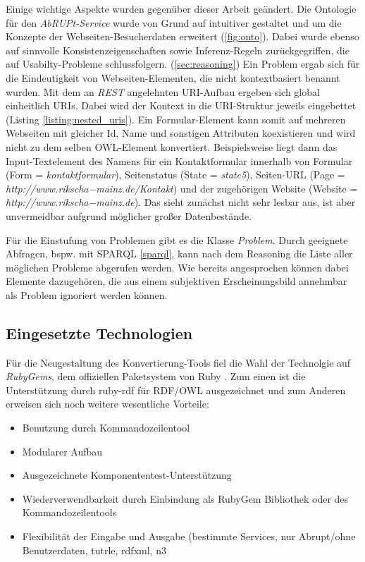\documentclass[runningheads,a4paper]{llncs}
\begin{document}
Einige wichtige Aspekte wurden gegenüber dieser Arbeit geändert. 
Die Ontologie für den \textit{AbRUPt-Service} wurde von Grund auf intuitiver gestaltet und um die Konzepte der Webseiten-Besucherdaten erweitert (\ref{fig:onto}). 
Dabei wurde ebenso auf sinnvolle Konsistenzeigenschaften sowie Inferenz-Regeln zurückgegriffen, die auf Usabilty-Probleme schlussfolgern. (\ref{sec:reasoning})
Ein Problem ergab sich für die Eindeutigkeit von Webseiten-Elementen, die nicht kontextbasiert benannt wurden. 
Mit dem an \textit{REST} \cite{rest} angelehnten URI-Aufbau ergeben sich global einheitlich URIs.
Dabei wird der Kontext in die URI-Struktur jeweils eingebettet (Listing \ref{listing:nested_uris}). 
Ein Formular-Element kann somit auf mehreren Webseiten mit gleicher Id, Name und sonstigen Attributen koexistieren und wird nicht zu dem selben OWL-Element konvertiert. 
Beispielsweise liegt dann das Input-Textelement des Namens für ein Kontaktformular innerhalb von Formular (Form = \textit{kontaktformular}), Seitenstatus (State = \textit{state5}), Seiten-URL (Page = \textit{http://www.rikscha−mainz.de/Kontakt}) und der zugehörigen Website (Website = \textit{http://www.rikscha−mainz.de}).
Das sieht zunächst nicht sehr lesbar aus, ist aber unvermeidbar aufgrund möglicher großer Datenbestände. 


 
Für die Einstufung von Problemen gibt es die Klasse \textit{Problem}. 
Durch geeignete Abfragen, bspw. mit SPARQL \ref{sparql}, kann nach dem Reasoning die Liste aller möglichen Probleme abgerufen werden. 
Wie bereits angesprochen können dabei Elemente dazugehören, die aus einem subjektiven Erscheinungsbild annehmbar als Problem ignoriert werden können.

\subsection{Eingesetzte Technologien}
\label{sec:technology}

Für die Neugestaltung des Konvertierung-Tools fiel die Wahl der Technolgie auf \textit{RubyGems}, dem offiziellen Paketsystem von Ruby . 
Zum einen ist die Unterstützung durch ruby-rdf \cite{ruby-rdf} für RDF/OWL ausgezeichnet und zum Anderen erweisen sich noch weitere wesentliche Vorteile:
\begin{itemize}
    \item{Benutzung durch Kommandozeilentool}
    \item{Modularer Aufbau}
    \item{Ausgezeichnete Komponententest-Unterstützung}
    \item{Wiederverwendbarkeit durch Einbindung als RubyGem Bibliothek oder des Kommandozeilentools}
    \item{Flexibilität der Eingabe und Ausgabe (bestimmte Services, nur Abrupt/ohne Benutzerdaten, tutrle, rdfxml, n3}
\end{itemize}
\end{document}
